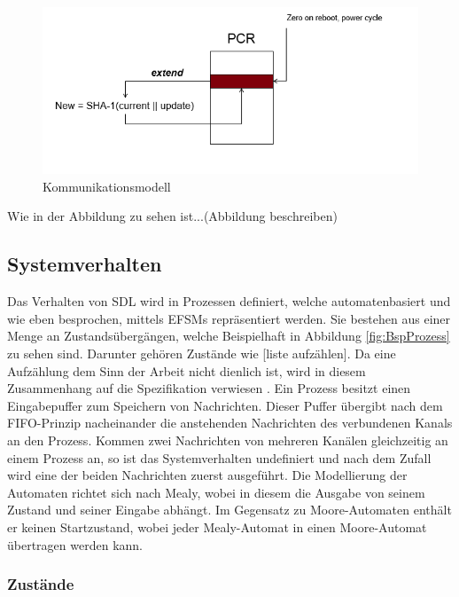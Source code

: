 \begin{figure}[ht]
	\centering
	\includegraphics[width=1\textwidth]{test.png}
	\caption{Kommunikationsmodell}
	\label{fig:KommModell}
\end{figure}

Wie in der Abbildung zu sehen ist...(Abbildung beschreiben)


\subsection{Systemverhalten}
\label{ssc:Verhalten}
Das Verhalten von \ac{SDL} wird in Prozessen definiert, welche automatenbasiert und wie eben besprochen, mittels \ac{EFSM}s repräsentiert werden. Sie bestehen aus einer Menge an Zustandsübergängen, welche Beispielhaft in Abbildung \ref{fig:BspProzess} zu sehen sind. Darunter gehören Zustände wie [liste aufzählen]. Da eine Aufzählung dem Sinn der Arbeit nicht dienlich ist, wird in diesem Zusammenhang auf die Spezifikation verwiesen \cite{ITU18}.
Ein Prozess besitzt einen Eingabepuffer zum Speichern von Nachrichten. Dieser Puffer übergibt nach dem \ac{FIFO}-Prinzip nacheinander die anstehenden Nachrichten des verbundenen Kanals an den Prozess. Kommen zwei Nachrichten von mehreren Kanälen gleichzeitig an einem Prozess an, so ist das Systemverhalten undefiniert und nach dem Zufall wird eine der beiden Nachrichten zuerst ausgeführt.
Die Modellierung der Automaten richtet sich nach Mealy, wobei in diesem die Ausgabe von seinem Zustand und seiner Eingabe abhängt.
Im Gegensatz zu Moore-Automaten enthält er keinen Startzustand, wobei jeder Mealy-Automat in einen Moore-Automat übertragen werden kann.


\subsubsection{Zustände}
\label{sssc:Verhalten}

